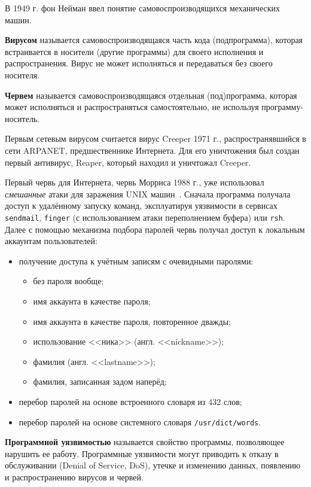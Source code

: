 \documentclass[10pt,a4paper]{book}
\begin{document}
В 1949 г. фон Нейман ввел понятие самовоспроизводящихся механических машин.

\textbf{Вирусом} называется самовоспроизводящаяся часть кода (подпрограмма), которая встраивается в носители (другие программы) для своего исполнения и распространения. Вирус не может исполняться и передаваться без своего носителя.

\textbf{Червем} называется самовоспроизводящаяся отдельная (под)программа, которая может исполняться и распространяться самостоятельно, не используя программу-носитель.

Первым сетевым вирусом считается вирус Creeper 1971 г., распространявшийся в сети ARPANET, предшественнике Интернета. Для его уничтожения был создан первый антивирус, Reaper, который находил и уничтожал Creeper.

Первый червь для Интернета, червь Морриса 1988 г., уже использовал \emph{смешанные} атаки для заражения UNIX машин~\cite{EichinRochlis:1988}\cite{Spafford:1989}. Сначала программа получала доступ к удалённому запуску команд, эксплуатируя уязвимости в сервисах \texttt{sendmail}, \texttt{finger} (с использованием атаки переполнением буфера) или \texttt{rsh}. Далее с помощью механизма подбора паролей червь получал доступ к локальным аккаунтам пользователей:
\begin{itemize}
    \item получение доступа к учётным записям с очевидными паролями:
		\begin{itemize}
			\item без пароля вообще;
			\item имя аккаунта в качестве пароля;
			\item имя аккаунта в качестве пароля, повторенное дважды;
			\item использование <<ника>> (англ. <<nickname>>);
			\item фамилия (англ. <<lastname>>);
			\item фамилия, записанная задом наперёд;
		\end{itemize}
		\item перебор паролей на основе встроенного словаря из 432 слов;
		\item перебор паролей на основе системного словаря \texttt{/usr/dict/words}.
\end{itemize}

\textbf{Программной уязвимостью} называется свойство программы, позволяющее нарушить ее работу. Программные уязвимости могут приводить к отказу в обслуживании (Denial of Service, DoS), утечке и изменению данных, появлению и распространению вирусов и червей.
\end{document}
